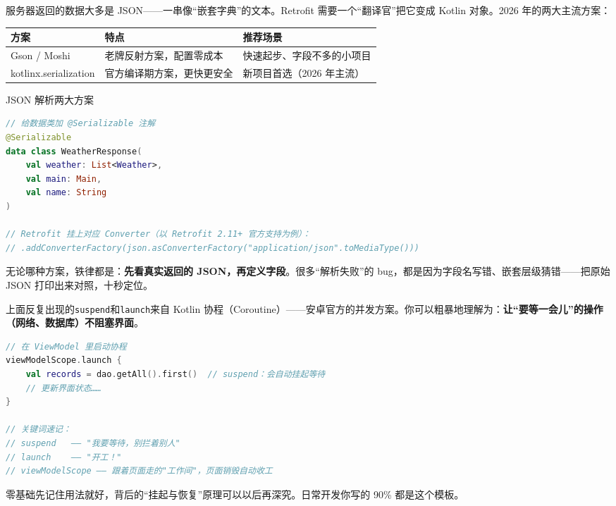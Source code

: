 
服务器返回的数据大多是 JSON——一串像“嵌套字典”的文本。Retrofit 需要一个“翻译官”把它变成 Kotlin 对象。2026 年的两大主流方案：

\begin{center}
\begin{tabularx}{\linewidth}{|X|X|X|}
\hline
\textbf{方案} & \textbf{特点} & \textbf{推荐场景} \tabularnewline
\hline
Gson / Moshi & 老牌反射方案，配置零成本 & 快速起步、字段不多的小项目 \tabularnewline
kotlinx.serialization & 官方编译期方案，更快更安全 & 新项目首选（2026 年主流） \tabularnewline
\hline
\end{tabularx}
\end{center}

\begin{center}\small\color{gray}JSON 解析两大方案\end{center}

\begin{lstlisting}[language=Kotlin]
// 给数据类加 @Serializable 注解
@Serializable
data class WeatherResponse(
    val weather: List<Weather>,
    val main: Main,
    val name: String
)

// Retrofit 挂上对应 Converter（以 Retrofit 2.11+ 官方支持为例）：
// .addConverterFactory(json.asConverterFactory("application/json".toMediaType()))
\end{lstlisting}

无论哪种方案，铁律都是：\textbf{先看真实返回的 JSON，再定义字段}。很多“解析失败”的 bug，都是因为字段名写错、嵌套层级猜错——把原始 JSON 打印出来对照，十秒定位。


上面反复出现的\texttt{suspend}和\texttt{launch}来自 Kotlin 协程（Coroutine）——安卓官方的并发方案。你可以粗暴地理解为：\textbf{让“要等一会儿”的操作（网络、数据库）不阻塞界面}。

\begin{lstlisting}[language=Kotlin]
// 在 ViewModel 里启动协程
viewModelScope.launch {
    val records = dao.getAll().first()  // suspend：会自动挂起等待
    // 更新界面状态……
}

// 关键词速记：
// suspend   —— "我要等待，别拦着别人"
// launch    —— "开工！"
// viewModelScope —— 跟着页面走的"工作间"，页面销毁自动收工
\end{lstlisting}

零基础先记住用法就好，背后的“挂起与恢复”原理可以以后再深究。日常开发你写的 90\% 都是这个模板。

